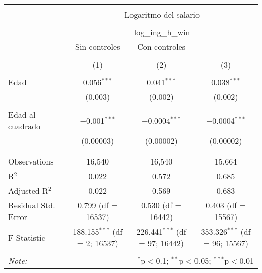 
\begin{table}[!htbp] \centering 
  \caption{} 
  \label{} 
\begin{tabular}{@{\extracolsep{5pt}}lccc} 
\\[-1.8ex]\hline 
\hline \\[-1.8ex] 
 & \multicolumn{3}{c}{Logaritmo del salario} \\ 
\cline{2-4} 
\\[-1.8ex] & \multicolumn{3}{c}{log\_ing\_h\_win} \\ 
 & Sin controles & Con controles &  \\ 
\\[-1.8ex] & (1) & (2) & (3)\\ 
\hline \\[-1.8ex] 
 Edad & 0.056$^{***}$ & 0.041$^{***}$ & 0.038$^{***}$ \\ 
  & (0.003) & (0.002) & (0.002) \\ 
  & & & \\ 
 Edad al cuadrado & $-$0.001$^{***}$ & $-$0.0004$^{***}$ & $-$0.0004$^{***}$ \\ 
  & (0.00003) & (0.00002) & (0.00002) \\ 
  & & & \\ 
\hline \\[-1.8ex] 
Observations & 16,540 & 16,540 & 15,664 \\ 
R$^{2}$ & 0.022 & 0.572 & 0.685 \\ 
Adjusted R$^{2}$ & 0.022 & 0.569 & 0.683 \\ 
Residual Std. Error & 0.799 (df = 16537) & 0.530 (df = 16442) & 0.403 (df = 15567) \\ 
F Statistic & 188.155$^{***}$ (df = 2; 16537) & 226.441$^{***}$ (df = 97; 16442) & 353.326$^{***}$ (df = 96; 15567) \\ 
\hline 
\hline \\[-1.8ex] 
\textit{Note:}  & \multicolumn{3}{r}{$^{*}$p$<$0.1; $^{**}$p$<$0.05; $^{***}$p$<$0.01} \\ 
\end{tabular} 
\end{table} 
